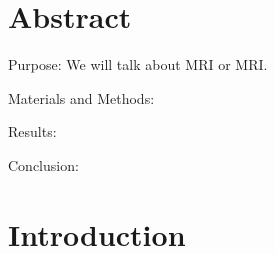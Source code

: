 \documentclass[11pt]{article}
\begin{document}
\section*{Abstract}

Purpose: We will talk about \acrfull{MRI} or \acrshort{MRI}. \blindtext

Materials and Methods: \blindtext

Results: \blindtext

Conclusion: \blindtext

\clearpage

\section*{Introduction}
\label{sec:intro}
\blindtext
\end{document}
